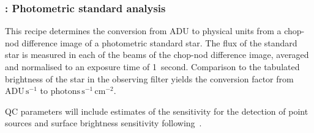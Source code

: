 
\clearpage
\subsubsection{:  Photometric standard analysis}
\label{n_img_std_process}
\label{rec:n_img_std_process}
\label{ssec:n_img_std_process}
\label{sssec:n_img_std_process}
\label{metis_n_img_std_process}
\label{rec:metis_n_img_std_process}
\label{sssec:metis_n_img_std_process}

This recipe determines the conversion from ADU to physical units from
a chop-nod difference image of a photometric standard star.  The flux
of the standard star is measured in each of the beams of the chop-nod
difference image, averaged and normalised to an exposure time of
1~second. Comparison to the tabulated brightness of the star in the
observing filter yields the conversion factor from
$\mathrm{ADU}\,\mathrm{s}^{-1}$ to
$\mathrm{photons}\,\mathrm{s}^{-1}\,\mathrm{cm}^{-2}$.

QC parameters will include estimates of the sensitivity for the
detection of point sources and surface brightness sensitivity
following~\cite{visir_manual}.

